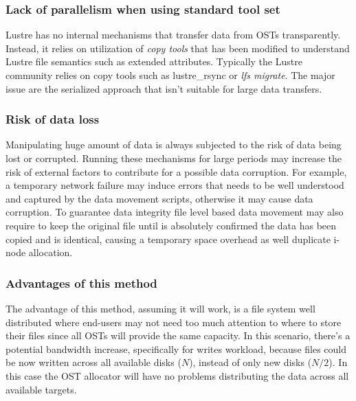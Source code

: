 \documentclass{article}
\begin{document}
\subsubsection{Lack of parallelism when using standard tool set}
Lustre has no internal mechanisms that transfer data from OSTs transparently. Instead, it relies on utilization of \textit{copy tools} that has been modified to understand Lustre file semantics such as extended attributes. 
Typically the Lustre community relies on copy tools such as lustre\_rsync or \textit{lfs migrate}. The major issue are the serialized approach that isn't suitable for large data transfers.

\subsubsection{Risk of data loss}
Manipulating huge amount of data is always subjected to the risk of data being lost or corrupted. Running these mechanisms for large periods may increase the risk of external factors to contribute for a possible data corruption. For example, a temporary network failure may induce errors that needs to be well understood and captured by the data movement scripts, otherwise it may cause data corruption. To guarantee data integrity file level based data movement may also require to keep the original file until is absolutely confirmed the data has been copied and is identical, causing a temporary space overhead as well duplicate i-node allocation.

\subsubsection{Advantages of this method}
The advantage of this method, assuming it will work, is a file system well distributed where end-users may not need too much attention to where to store their files since all OSTs will provide the same capacity. 
In this scenario, there's a potential bandwidth increase, specifically for writes workload, because files could be now  written across all available disks ($N$), instead of only new disks ($N/2$). In this case the OST allocator will have no problems distributing the data across all available targets.
\end{document}

